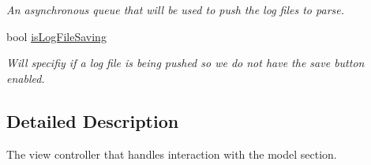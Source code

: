 \begin{DoxyCompactItemize}
\begin{DoxyCompactList}\small\item\em An asynchronous queue that will be used to push the log files to parse. \end{DoxyCompactList}\item 
\hypertarget{interface_model_section_view_controller_a2e838e7ff8d293aa399d4c7b714b3dbc}{bool \hyperlink{interface_model_section_view_controller_a2e838e7ff8d293aa399d4c7b714b3dbc}{is\-Log\-File\-Saving}}\label{interface_model_section_view_controller_a2e838e7ff8d293aa399d4c7b714b3dbc}

\begin{DoxyCompactList}\small\item\em Will specifiy if a log file is being pushed so we do not have the save button enabled. \end{DoxyCompactList}\end{DoxyCompactItemize}


\subsection{Detailed Description}
The view controller that handles interaction with the model section. 

